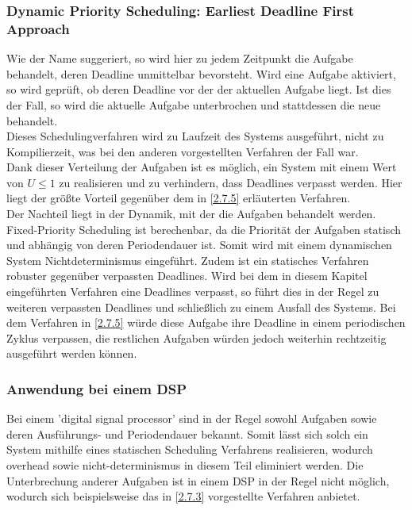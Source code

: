 \subsubsection{Dynamic Priority Scheduling: Earliest Deadline First Approach}
Wie der Name suggeriert, so wird hier zu jedem Zeitpunkt die Aufgabe behandelt, deren Deadline unmittelbar bevorsteht. Wird eine Aufgabe aktiviert, so wird geprüft, ob deren Deadline vor der der aktuellen Aufgabe liegt. Ist dies der Fall, so wird die aktuelle Aufgabe unterbrochen und stattdessen die neue behandelt.\\
Dieses Schedulingverfahren wird zu Laufzeit des Systems ausgeführt, nicht zu Kompilierzeit, was bei den anderen vorgestellten Verfahren der Fall war.\\
Dank dieser Verteilung der Aufgaben ist es möglich, ein System mit einem Wert von $U \leq 1$ zu realisieren und zu verhindern, dass Deadlines verpasst werden. Hier liegt der größte Vorteil gegenüber dem in \ref{2.7.5} erläuterten Verfahren.\\
Der Nachteil liegt in der Dynamik, mit der die Aufgaben behandelt werden. Fixed-Priority Scheduling ist berechenbar, da die Priorität der Aufgaben statisch und abhängig von deren Periodendauer ist. Somit wird mit einem dynamischen System Nichtdeterminismus eingeführt. Zudem ist ein statisches Verfahren robuster gegenüber verpassten Deadlines. Wird bei dem in diesem Kapitel eingeführten Verfahren eine Deadlines verpasst, so führt dies in der Regel zu weiteren verpassten Deadlines und schließlich zu einem Ausfall des Systems. Bei dem Verfahren in \ref{2.7.5} würde diese Aufgabe ihre Deadline in einem periodischen Zyklus verpassen, die restlichen Aufgaben würden jedoch weiterhin rechtzeitig ausgeführt werden können.

\subsubsection{Anwendung bei einem DSP}
Bei einem 'digital signal processor' sind in der Regel sowohl Aufgaben sowie deren Ausführungs- und Periodendauer bekannt. Somit lässt sich solch ein System mithilfe eines statischen Scheduling Verfahrens realisieren, wodurch overhead sowie nicht-determinismus in diesem Teil eliminiert werden\cite{Scheduling}. Die Unterbrechung anderer Aufgaben ist in einem DSP in der Regel nicht möglich, wodurch sich beispielsweise das in \ref{2.7.3} vorgestellte Verfahren anbietet.



